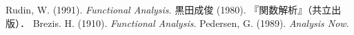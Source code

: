\documentclass[uplatex,dvipdfmx]{jsarticle}
\begin{document}
\begin{thebibliography}{9}
    Rudin, W. (1991). \textit{Functional Analysis}.
    黒田成俊 (1980). 『関数解析』（共立出版）．
    Brezis. H. (1910). \textit{Functional Analysis}.
    Pedersen, G. (1989). \textit{Analysis Now}.
\end{thebibliography}
\end{document}
